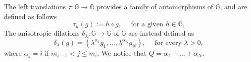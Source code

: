 \documentclass[11pt]{amsart}
\numberwithin{equation}{section} %
\theoremstyle{definition}
\begin{document}
The left translations $\tau : \mathbb{G}\to \mathbb{G}$ provides a family of automorphisms of $\mathbb{G}$, and are defined as follows
\begin{equation}\label{eq:left-translation}
	\tau_{h}(g):= h \diamond g, \quad \textrm{ for a given $h\in \mathbb{G}$,} 
\end{equation}
The anisotropic dilations $\delta_{\lambda}: \mathbb{G}\to \mathbb{G}$ of $\mathbb{G}$ are instead defined as 
\begin{equation}\label{eq:dilation}
	\delta_{\lambda}(g) = \left(\lambda^{\alpha_1}g_1, \ldots, \lambda^{\alpha_{N}}g_N \right), \quad \textrm{ for every } \lambda >0,
\end{equation}
\noindent where $\alpha_{j} = i$ if $m_{i-1}<j\leq m_{i}$.
We notice that $Q = \alpha_1 + \ldots + \alpha_{N}$.\\

\medskip

\end{document}
